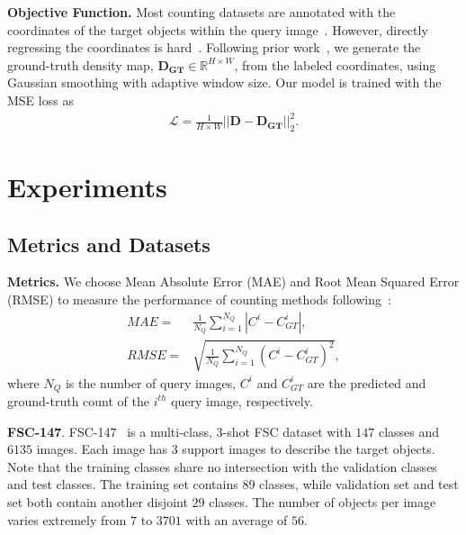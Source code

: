 \documentclass[10pt,twocolumn,letterpaper]{article}
\begin{document}
\vspace{2pt}\noindent\textbf{Objective Function.}
Most counting datasets are annotated with the coordinates of the target objects within the query image~\cite{ucsd, mall, mcnn}.
However, directly regressing the coordinates is hard~\cite{lempitsky2010learning, mcnn}.
Following prior work~\cite{famnet}, we generate the ground-truth density map, $\bm{D_{GT}} \in \mathbb{R}^{H \times W}$, from the labeled coordinates, using Gaussian smoothing with adaptive window size.
Our model is trained with the MSE loss as
\begin{align}
    \mathcal{L} = \frac{1}{H \times W} ||\bm{D} - \bm{D_{GT}}||_2^2.  \label{equ:mse_loss}
\end{align}
 \section{Experiments} \label{sec:exp}


\subsection{Metrics and Datasets}

\vspace{2pt}\noindent \textbf{Metrics.}  We choose Mean Absolute Error (MAE) and Root Mean Squared Error (RMSE) to measure the performance of counting methods following~\cite{pdem, famnet}:
\begin{equation}
\begin{aligned}
    MAE = & \frac{1}{N_Q} \sum_{i=1}^{N_Q} |C^i - C^i_{GT}|, \\ RMSE = & \sqrt{\frac{1}{N_Q} \sum_{i=1}^{N_Q} (C^i - C^i_{GT})^2},
\end{aligned}
\label{eq:metric}
\end{equation}
where $N_Q$ is the number of query images, $C^i$ and $C^i_{GT}$ are the predicted and ground-truth count of the $i^{th}$ query image, respectively. 


\vspace{2pt}\noindent \textbf{FSC-147}.  FSC-147~\cite{famnet} is a multi-class, 3-shot FSC dataset with $147$ classes and $6135$ images. Each image has $3$ support images to describe the target objects. Note that the training classes share no intersection with the validation classes and test classes. The training set contains $89$ classes, while validation set and test set both contain another disjoint $29$ classes. The number of objects per image varies extremely from $7$ to $3701$ with an average of $56$. 
\end{document}
